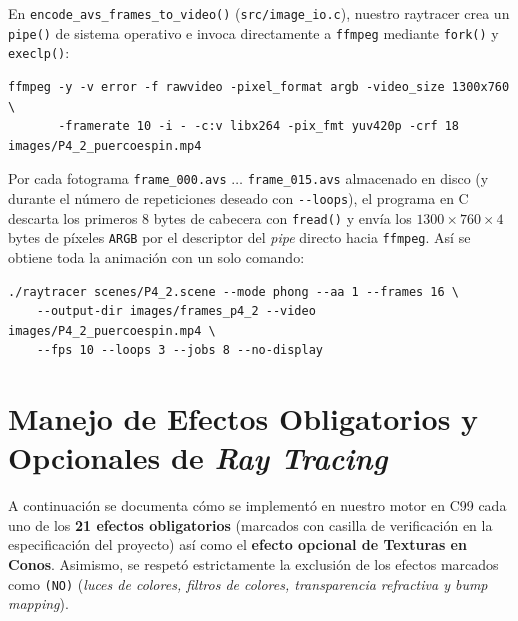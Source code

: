 \documentclass[11pt,letterpaper]{article}
\begin{document}
En \texttt{encode\_avs\_frames\_to\_video()} (\texttt{src/image\_io.c}), nuestro raytracer crea un \texttt{pipe()} de sistema operativo e invoca directamente a \texttt{ffmpeg} mediante \texttt{fork()} y \texttt{execlp()}:
\begin{lstlisting}
ffmpeg -y -v error -f rawvideo -pixel_format argb -video_size 1300x760 \
       -framerate 10 -i - -c:v libx264 -pix_fmt yuv420p -crf 18 images/P4_2_puercoespin.mp4
\end{lstlisting}
Por cada fotograma \texttt{frame\_000.avs} $\dots$ \texttt{frame\_015.avs} almacenado en disco (y durante el número de repeticiones deseado con \texttt{-{}-loops}), el programa en C descarta los primeros 8 bytes de cabecera con \texttt{fread()} y envía los $1300 \times 760 \times 4$ bytes de píxeles \texttt{ARGB} por el descriptor del \textit{pipe} directo hacia \texttt{ffmpeg}. Así se obtiene toda la animación con un solo comando:
\begin{lstlisting}
./raytracer scenes/P4_2.scene --mode phong --aa 1 --frames 16 \
    --output-dir images/frames_p4_2 --video images/P4_2_puercoespin.mp4 \
    --fps 10 --loops 3 --jobs 8 --no-display
\end{lstlisting}

\newpage
\section{Manejo de Efectos Obligatorios y Opcionales de \textit{Ray Tracing}}

A continuación se documenta cómo se implementó en nuestro motor en C99 cada uno de los \textbf{21 efectos obligatorios} (marcados con casilla de verificación en la especificación del proyecto) así como el \textbf{efecto opcional de Texturas en Conos}. Asimismo, se respetó estrictamente la exclusión de los efectos marcados como \texttt{(NO)} (\textit{luces de colores, filtros de colores, transparencia refractiva y bump mapping}).
\end{document}
